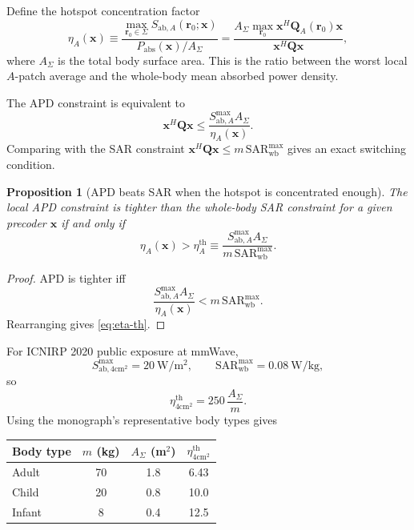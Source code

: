 \documentclass[11pt]{article}
\newtheorem{proposition}{Proposition}
\newcommand{\rr}{\mathbf{r}}
\newcommand{\x}{\mathbf{x}}
\newcommand{\Q}{\mathbf{Q}}
\newcommand{\Sigmaset}{\Sigma}
\newcommand{\SARwb}{\mathrm{SAR}_{\mathrm{wb}}}
\begin{document}
Define the hotspot concentration factor
\begin{equation}
  \eta_A(\x)
  \equiv
  \frac{\max_{\rr_0 \in \Sigmaset} S_{\mathrm{ab},A}(\rr_0;\x)}
       {P_{\mathrm{abs}}(\x)/A_\Sigma}
  =
  \frac{A_\Sigma \max_{\rr_0} \x^H \Q_A(\rr_0)\x}
       {\x^H \Q \x},
\end{equation}
where $A_\Sigma$ is the total body surface area. This is the ratio between the
worst local $A$-patch average and the whole-body mean absorbed power density.

The APD constraint is equivalent to
\begin{equation}
  \x^H \Q \x \le \frac{S_{\mathrm{ab},A}^{\max} A_\Sigma}{\eta_A(\x)}.
\end{equation}
Comparing with the SAR constraint $\x^H \Q \x \le m\,\SARwb^{\max}$ gives an
exact switching condition.

\begin{proposition}[APD beats SAR when the hotspot is concentrated enough]
The local APD constraint is tighter than the whole-body SAR constraint for a
given precoder $\x$ if and only if
\begin{equation}
  \eta_A(\x)
  >
  \eta_A^{\mathrm{th}}
  \equiv
  \frac{S_{\mathrm{ab},A}^{\max} A_\Sigma}{m\,\SARwb^{\max}}.
  \label{eq:eta-th}
\end{equation}
\end{proposition}

\begin{proof}
APD is tighter iff
\begin{equation}
  \frac{S_{\mathrm{ab},A}^{\max} A_\Sigma}{\eta_A(\x)}
  < m\,\SARwb^{\max}.
\end{equation}
Rearranging gives \eqref{eq:eta-th}.
\end{proof}

For ICNIRP 2020 public exposure at mmWave,
\begin{equation}
  S_{\mathrm{ab},4\mathrm{cm}^2}^{\max} = 20~\mathrm{W/m^2},
  \qquad
  \SARwb^{\max} = 0.08~\mathrm{W/kg},
\end{equation}
so
\begin{equation}
  \eta_{4\mathrm{cm}^2}^{\mathrm{th}}
  = 250\,\frac{A_\Sigma}{m}.
\end{equation}
Using the monograph's representative body types gives
\begin{center}
\begin{tabular}{lccc}
\toprule
Body type & $m$ (kg) & $A_\Sigma$ (m$^2$) & $\eta_{4\mathrm{cm}^2}^{\mathrm{th}}$ \\
\midrule
Adult  & 70 & 1.8 & 6.43 \\
Child  & 20 & 0.8 & 10.0 \\
Infant &  8 & 0.4 & 12.5 \\
\bottomrule
\end{tabular}
\end{center}
\end{document}
